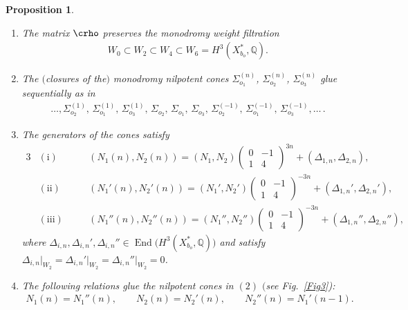 \documentclass[10pt,a4paper]{amsart}
\numberwithin{equation}{section}
\newtheorem{Proposition}[Theorem]{Proposition}
\begin{document}
\begin{Proposition}\label{prop:Seq-N-Cones}\quad \begin{enumerate}\itemsep=0pt
\item[{\rm (1)}] The matrix $\crho$ preserves the monodromy weight filtration
\begin{gather*}
W_{0}\subset W_{2}\subset W_{4}\subset W_{6}=H^{3}(X_{b_{o}}^{*},\mathbb{Q}).
\end{gather*}
\item[{\rm (2)}] The $($closures of the$)$ monodromy nilpotent cones $\Sigma_{o_{1}}^{(n)}$, $\Sigma_{o_{2}}^{(n)}$, $\Sigma_{o_{3}}^{(n)}$ glue sequentially as in
\begin{gather*}
\dots,\Sigma_{o_{2}}^{(1)},\,\Sigma_{o_{1}}^{(1)},\,\Sigma_{o_{3}}^{(1)},\,\Sigma_{o_{2}},\,
\Sigma_{o_{1}},\,\Sigma_{o_{3}},\,\Sigma_{o_{2}}^{(-1)},\,\Sigma_{o_{1}}^{(-1)},\,\Sigma_{o_{3}}^{(-1)},\dots\,.
\end{gather*}

\item[{\rm (3)}] The generators of the cones satisfy
\begin{alignat*}{3}
& \mathrm{(i)} & & (N_{1}(n),N_{2}(n))=(N_{1},N_{2})\left(\begin{matrix}0 & -1\\
1 & 4 \end{matrix}\right)^{3n}+(\Delta_{1,n},\Delta_{2,n}),&\\
& \mathrm{(ii)} && (N_{1}'(n),N_{2}'(n))=(N_{1}',N_{2}')\left(\begin{matrix}0 & -1\\
1 & 4 \end{matrix}\right)^{-3n}+(\Delta_{1,n}',\Delta_{2,n}'),& \\
& \mathrm{(iii)} \quad & & (N_{1}''(n),N_{2}''(n))=(N_{1}'',N_{2}'')\left(\begin{matrix}0 & -1\\
1 & 4 \end{matrix}\right)^{-3n}+(\Delta_{1,n}'',\Delta_{2,n}''),&
\end{alignat*}
where $\Delta_{i,n},\Delta_{i,n}',\Delta_{i,n}''\in\operatorname{End}\big(H^{3}(X_{b_{o}}^{*},\mathbb{Q})\big)$ and satisfy $\Delta_{i,n}\vert_{W_{2}}=\Delta_{i,n}'\vert_{W_{2}}=\Delta_{i,n}''\vert_{W_{2}}=0$.

\item[{\rm (4)}] The following relations glue the nilpotent cones in $(2)$ $($see Fig.~{\rm \ref{Fig3})}:
\begin{gather*}
N_{1}(n)=N_{1}''(n),\qquad N_{2}(n)=N_{2}'(n),\qquad N_{2}''(n)=N_{1}'(n-1).
\end{gather*}
\end{enumerate}\end{Proposition}
\end{document}
